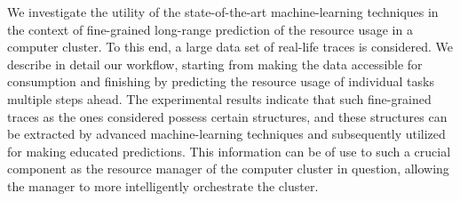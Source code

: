 We investigate the utility of the state-of-the-art machine-learning techniques
in the context of fine-grained long-range prediction of the resource usage in a
computer cluster. To this end, a large data set of real-life traces is
considered. We describe in detail our workflow, starting from making the data
accessible for consumption and finishing by predicting the resource usage of
individual tasks multiple steps ahead. The experimental results indicate that
such fine-grained traces as the ones considered possess certain structures, and
these structures can be extracted by advanced machine-learning techniques and
subsequently utilized for making educated predictions. This information can be
of use to such a crucial component as the resource manager of the computer
cluster in question, allowing the manager to more intelligently orchestrate the
cluster.

